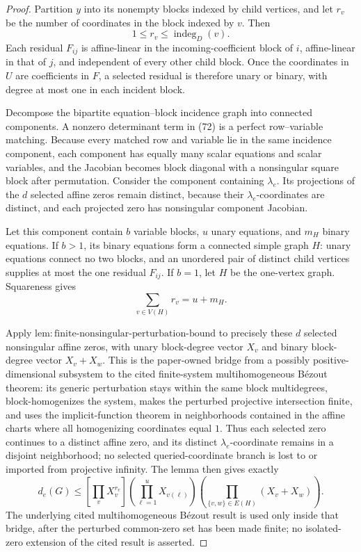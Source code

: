 \documentclass{article}
\begin{document}
\begin{proof}
Partition \(y\) into its nonempty blocks indexed by child vertices, and let \(r_v\) be the number of coordinates in the block indexed by \(v\).  Then
\[
 1\leq r_v\leq\operatorname{indeg}_D(v).
\tag{74}
\]
Each residual \(F_{ij}\) is affine-linear in the incoming-coefficient block of \(i\), affine-linear in that of \(j\), and independent of every other child block.  Once the coordinates in \(U\) are coefficients in \(F\), a selected residual is therefore unary or binary, with degree at most one in each incident block.

Decompose the bipartite equation--block incidence graph into connected components.  A nonzero determinant term in (72) is a perfect row--variable matching.  Because every matched row and variable lie in the same incidence component, each component has equally many scalar equations and scalar variables, and the Jacobian becomes block diagonal with a nonsingular square block after permutation.  Consider the component containing \(\lambda_e\).  Its projections of the \(d\) selected affine zeros remain distinct, because their \(\lambda_e\)-coordinates are distinct, and each projected zero has nonsingular component Jacobian.

Let this component contain \(b\) variable blocks, \(u\) unary equations, and \(m_H\) binary equations.  If \(b>1\), its binary equations form a connected simple graph \(H\): unary equations connect no two blocks, and an unordered pair of distinct child vertices supplies at most the one residual \(F_{ij}\).  If \(b=1\), let \(H\) be the one-vertex graph.  Squareness gives
\[
 \sum_{v\in V(H)}r_v=u+m_H.
\tag{75}
\]

Apply \(\mathrm{lem:finite\mbox{-}nonsingular\mbox{-}perturbation\mbox{-}bound}\) to precisely these \(d\) selected nonsingular affine zeros, with unary block-degree vector \(X_v\) and binary block-degree vector \(X_v+X_w\).  This is the paper-owned bridge from a possibly positive-dimensional subsystem to the cited finite-system multihomogeneous B\'ezout theorem: its generic perturbation stays within the same block multidegrees, block-homogenizes the system, makes the perturbed projective intersection finite, and uses the implicit-function theorem in neighborhoods contained in the affine charts where all homogenizing coordinates equal \(1\).  Thus each selected zero continues to a distinct affine zero, and its distinct \(\lambda_e\)-coordinate remains in a disjoint neighborhood; no selected queried-coordinate branch is lost to or imported from projective infinity.  The lemma then gives exactly
\[
 d_e(G)\leq
 [\prod_vX_v^{r_v}]
 \left(\prod_{\ell=1}^{u}X_{v(\ell)}\right)
 \left(\prod_{\{v,w\}\in E(H)}(X_v+X_w)\right).
\tag{76}
\]
The underlying cited multihomogeneous B\'ezout result is used only inside that bridge, after the perturbed common-zero set has been made finite; no isolated-zero extension of the cited result is asserted.


\end{proof}
\end{document}
